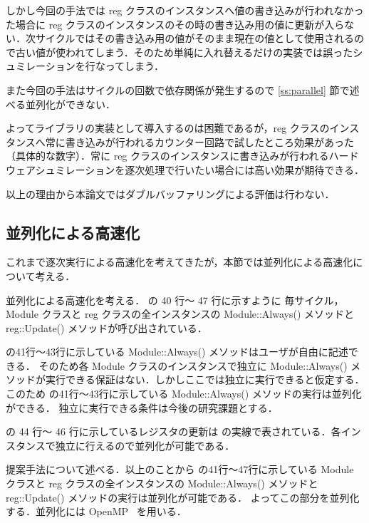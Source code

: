 しかし今回の手法では reg
クラスのインスタンスへ値の書き込みが行われなかった場合に reg
クラスのインスタンスのその時の書き込み用の値に更新が入らない．次サイクルではその書き込み用の値がそのまま現在の値として使用されるので古い値が使われてしまう．そのため単純に入れ替えるだけの実装では誤ったシュミレーションを行なってしまう．

また今回の手法はサイクルの回数で依存関係が発生するので \ref{ss:parallel}
節で述べる並列化ができない．

よってライブラリの実装として導入するのは困難であるが，reg
クラスのインスタンスへ常に書き込みが行われるカウンター回路で試したところ効果があった（具体的な数字）．常に
reg
クラスのインスタンスに書き込みが行われるハードウェアシュミレーションを逐次処理で行いたい場合には高い効果が期待できる．

以上の理由から本論文ではダブルバッファリングによる評価は行わない．

\fi

\subsection{並列化による高速化 \label{ss:parallel}}

これまで逐次実行による高速化を考えてきたが，本節では並列化による高速化について考える．

並列化による高速化を考える． の 40 行〜 47 行に示すように
毎サイクル，Module クラスと reg クラスの全インスタンスの Module::Always() メソッドと reg::Update() メソッドが呼び出されている．

 の41行〜43行に示している Module::Always() メソッドはユーザが自由に記述できる．
そのため各 Module クラスのインスタンスで独立に Module::Always() メソッドが実行できる保証はない．しかしここでは独立に実行できると仮定する．
このため の41行〜43行に示している Module::Always() メソッドの実行は並列化ができる．
独立に実行できる条件は今後の研究課題とする．

 の 44 行〜 46 行に示しているレジスタの更新は の実線で表されている．各インスタンスで独立に行えるので並列化が可能である．

提案手法について述べる．以上のことから の41行〜47行に示している
Module クラスと reg クラスの全インスタンスの Module::Always() メソッドと reg::Update() メソッドの実行は並列化が可能である．
よってこの部分を並列化する．並列化には OpenMP~\cite{openmp} を用いる．


